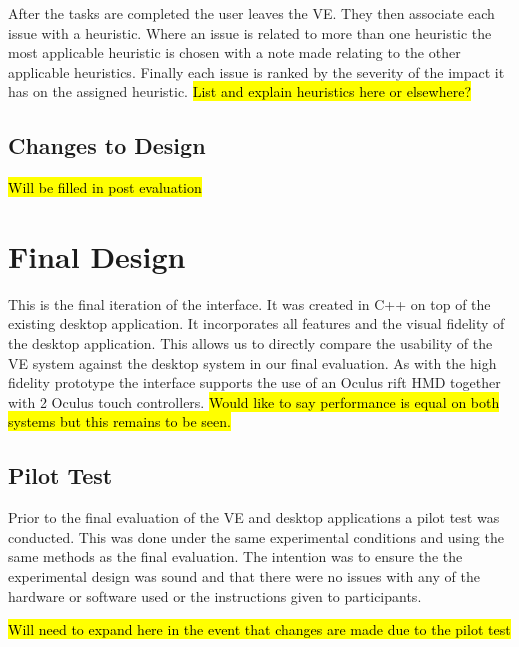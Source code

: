 \documentclass{article}
\begin{document}
\newline\newline
After the tasks are completed the user leaves the VE. They then associate each issue with a heuristic. Where an issue is related to more than one heuristic the most applicable heuristic is chosen with a note made relating to the other applicable heuristics\cite{Sutcliffe2004}. Finally each issue is ranked by the severity of the impact it has on the assigned heuristic.
\newline\newline
\hl{List and explain heuristics here or elsewhere?}

\subsection{Changes to Design}

\hl{Will be filled in post evaluation}

\section{Final Design}

This is the final iteration of the interface. It was created in C++ on top of the existing desktop application. It incorporates all features and the visual fidelity of the desktop application. This allows us to directly compare the usability of the VE system against the desktop system in our final evaluation.
\newline\newline
As with the high fidelity prototype the interface supports the use of an Oculus rift HMD together with 2 Oculus touch controllers. \hl{Would like to say performance is equal on both systems but this remains to be seen.}

\subsection{Pilot Test}

Prior to the final evaluation of the VE and desktop applications a pilot test was conducted. This was done under the same experimental conditions and using the same methods as the final evaluation. The intention was to ensure the the experimental design was sound and that there were no issues with any of the hardware or software used or the instructions given to participants.

\hl{Will need to expand here in the event that changes are made due to the pilot test}
\end{document}

